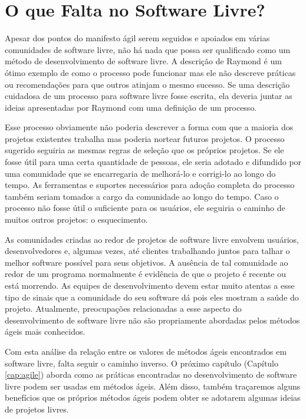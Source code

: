 \section{O que Falta no Software Livre?}
\label{sec:os-summary}

Apesar dos pontos do manifesto ágil serem seguidos e apoiados em
várias comunidades de software livre, não há nada que possa ser
qualificado como um método de desenvolvimento de software livre. A
descrição de Raymond \cite{Raymond1999} é um ótimo exemplo de como o
processo pode funcionar mas ele não descreve práticas ou recomendações
para que outros atinjam o mesmo sucesso. Se uma descrição cuidadosa de
um processo para software livre fosse escrita, ela deveria juntar as
ideias apresentadas por Raymond com uma definição de um processo.

Esse processo obviamente não poderia descrever a forma com que a
maioria dos projetos existentes trabalha mas poderia nortear futuros
projetos. O processo sugerido seguiria as mesmas regras de seleção que
os próprios projetos. Se ele fosse útil para uma certa quantidade de
pessoas, ele seria adotado e difundido por uma comunidade que se
encarregaria de melhorá-lo e corrigi-lo ao longo do tempo. As
ferramentas e suportes necessários para adoção completa do processo
também seriam tomados a cargo da comunidade ao longo do tempo. Caso o
processo não fosse útil o suficiente para os usuários, ele seguiria o
caminho de muitos outros projetos: o esquecimento.

As comunidades criadas ao redor de projetos de software livre envolvem
usuários, desenvolvedores e, algumas vezes, até clientes trabalhando
juntos para talhar o melhor software possível para seus objetivos. A
ausência de tal comunidade ao redor de um programa normalmente é
evidência de que o projeto é recente ou está morrendo. As equipes de
desenvolvimento devem estar muito atentas a esse tipo de sinais que a
comunidade do seu software dá pois eles mostram a saúde do
projeto. Atualmente, preocupações relacionadas a esse aspecto do
desenvolvimento de software livre não são propriamente abordadas pelos
métodos ágeis mais conhecidos.

Com esta análise da relação entre os valores de métodos ágeis
encontrados em software livre, falta seguir o caminho inverso. O
próximo capítulo (Capítulo \ref{cap:agile}) aborda como as práticas
encontradas no desenvolvimento de software livre podem ser usadas em
métodos ágeis. Além disso, também traçaremos alguns benefícios que os
próprios métodos ágeis podem obter se adotarem algumas ideias de
projetos livres.
